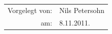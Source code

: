 \vspace{2cm}


\noindent \begin{center}
{\huge }\begin{tabular}{rl}
Vorgelegt von: & Nils Petersohn \tabularnewline am: & 8.11.2011.\tabularnewline
\end{tabular}
\par\end{center}{\huge \par}

\vspace{1cm}




\noindent \begin{center}
\medskip{}
\begin{tabular}{rl}
\tabularnewline
\end{tabular}
\par\end{center}

\newpage{}

%

